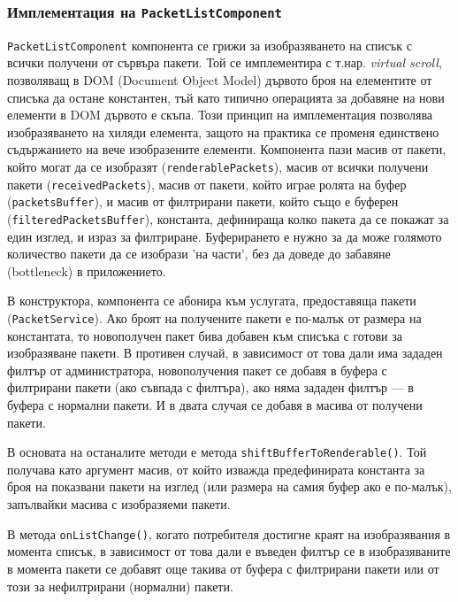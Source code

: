 \documentclass[12pt,a4paper,oneside]{book}
\begin{document}
\subsubsection{Имплементация на \texttt{PacketListComponent}}

\texttt{PacketListComponent} компонента се грижи за изобразяването на списък с
всички получени от сървъра пакети. Той се имплементира с т.нар. \textit{virtual
scroll}, позволяващ в DOM (Document Object Model) дървото броя на елементите от
списъка да остане константен, тъй като типично операцията за добавяне на нови
елементи в DOM дървото е скъпа. Този принцип на имплементация позволява изобразяването на хиляди
елемента, защото на практика се променя единствено съдържанието на вече
изобразените елементи.
Компонента пази масив от пакети, който могат да се изобразят
(\texttt{renderablePackets}), масив от
всички получени пакети (\texttt{receivedPackets}), масив от пакети, който
играе ролята на буфер (\texttt{packetsBuffer}), и масив от филтрирани пакети,
който също е буферен (\texttt{filteredPacketsBuffer}), константа, дефинираща колко пакета да се
покажат за един изглед, и израз за филтриране. Буферирането е нужно за да може
голямото количество пакети да се изобрази 'на части', без да доведе до забавяне
(bottleneck) в приложението.

В конструктора, компонента се абонира към услугата,
предоставяща пакети (\texttt{PacketService}).  Ако броят на получените
пакети е по-малък от размера
на константата, то новополучен пакет бива добавен към списъка с готови за
изобразяване пакети. В противен случай, в зависимост от това дали има зададен
филтър от администратора, новополучения пакет се добавя в буфера с филтрирани
пакети (ако съвпада с филтъра), ако няма зададен филтър --- в буфера
с нормални пакети. И в двата случая се добавя в масива от получени пакети.

В основата на останалите методи е метода \texttt{shiftBufferToRenderable()}. Той
получава като аргумент масив, от който изважда предефинирата константа за броя
на показвани пакети на изглед (или размера на самия буфер ако е по-малък),
запълвайки масива с изобразяеми пакети.



В метода \texttt{onListChange()}, когато потребителя достигне краят на
изобразявания в момента списък, в зависимост от това дали е въведен филтър се
в изобразяваните в момента пакети се добавят още такива от буфера с филтрирани
пакети или от този за нефилтрирани (нормални) пакети.
\end{document}
